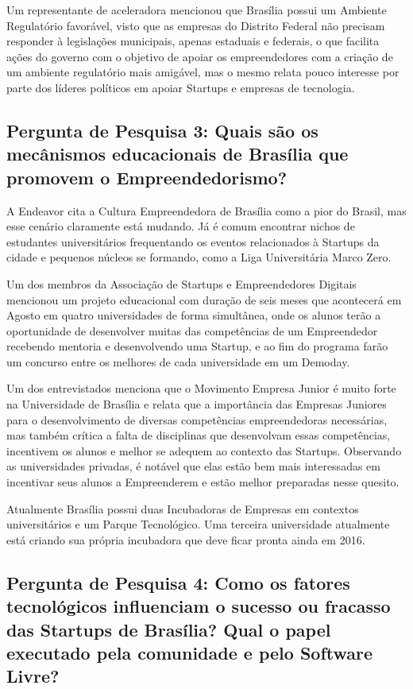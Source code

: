 Um representante de aceleradora mencionou que Brasília possui um Ambiente Regulatório favorável, visto que as empresas do Distrito Federal não precisam responder à legislações municipais, apenas estaduais e federais, o que facilita ações do governo com o objetivo de apoiar os empreendedores com a criação de um ambiente regulatório mais amigável, mas o mesmo relata pouco interesse por parte dos líderes políticos em apoiar Startups e empresas de tecnologia.
  
\subsection{Pergunta de Pesquisa 3: Quais são os mecânismos educacionais de Brasília que promovem o Empreendedorismo?}
\label{subsection:pergunta_de_pesquisa_3}

A Endeavor cita a Cultura Empreendedora de Brasília como a pior do Brasil, mas esse cenário claramente está mudando. Já é comum encontrar nichos de estudantes universitários frequentando os eventos relacionados à Startups da cidade e pequenos núcleos se formando, como a Liga Universitária Marco Zero. 

Um dos membros da Associação de Startups e Empreendedores Digitais mencionou um projeto educacional com duração de seis meses que acontecerá em Agosto em quatro universidades de forma simultânea, onde os alunos terão a oportunidade de desenvolver muitas das competências de um Empreendedor recebendo mentoria e desenvolvendo uma Startup, e ao fim do programa farão um concurso entre os melhores de cada universidade em um Demoday.

Um dos entrevistados menciona que o Movimento Empresa Junior é muito forte na Universidade de Brasília e relata que a importância das Empresas Juniores para o desenvolvimento de diversas competências empreendedoras necessárias, mas também crítica a falta de disciplinas que desenvolvam essas competências, incentivem os alunos e melhor se adequem ao contexto das Startups. Observando as universidades privadas, é notável que elas estão bem mais interessadas em incentivar seus alunos a Empreenderem e estão melhor preparadas nesse quesito.

Atualmente Brasília possui duas Incubadoras de Empresas em contextos universitários e um Parque Tecnológico. Uma terceira universidade atualmente está criando sua própria incubadora que deve ficar pronta ainda em 2016.

\subsection{Pergunta de Pesquisa 4: Como os fatores tecnológicos influenciam o sucesso ou fracasso das Startups de Brasília? Qual o papel executado pela comunidade e pelo Software Livre?}
\label{subsection:pergunta_de_pesquisa_4}

